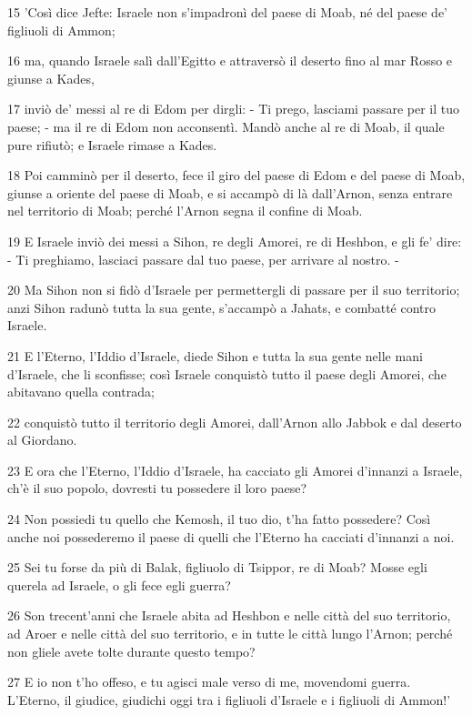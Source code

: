 \par 15 'Così dice Jefte: Israele non s'impadronì del paese di Moab, né del paese de' figliuoli di Ammon;
\par 16 ma, quando Israele salì dall'Egitto e attraversò il deserto fino al mar Rosso e giunse a Kades,
\par 17 inviò de' messi al re di Edom per dirgli: - Ti prego, lasciami passare per il tuo paese; - ma il re di Edom non acconsentì. Mandò anche al re di Moab, il quale pure rifiutò; e Israele rimase a Kades.
\par 18 Poi camminò per il deserto, fece il giro del paese di Edom e del paese di Moab, giunse a oriente del paese di Moab, e si accampò di là dall'Arnon, senza entrare nel territorio di Moab; perché l'Arnon segna il confine di Moab.
\par 19 E Israele inviò dei messi a Sihon, re degli Amorei, re di Heshbon, e gli fe' dire: - Ti preghiamo, lasciaci passare dal tuo paese, per arrivare al nostro. -
\par 20 Ma Sihon non si fidò d'Israele per permettergli di passare per il suo territorio; anzi Sihon radunò tutta la sua gente, s'accampò a Jahats, e combatté contro Israele.
\par 21 E l'Eterno, l'Iddio d'Israele, diede Sihon e tutta la sua gente nelle mani d'Israele, che li sconfisse; così Israele conquistò tutto il paese degli Amorei, che abitavano quella contrada;
\par 22 conquistò tutto il territorio degli Amorei, dall'Arnon allo Jabbok e dal deserto al Giordano.
\par 23 E ora che l'Eterno, l'Iddio d'Israele, ha cacciato gli Amorei d'innanzi a Israele, ch'è il suo popolo, dovresti tu possedere il loro paese?
\par 24 Non possiedi tu quello che Kemosh, il tuo dio, t'ha fatto possedere? Così anche noi possederemo il paese di quelli che l'Eterno ha cacciati d'innanzi a noi.
\par 25 Sei tu forse da più di Balak, figliuolo di Tsippor, re di Moab? Mosse egli querela ad Israele, o gli fece egli guerra?
\par 26 Son trecent'anni che Israele abita ad Heshbon e nelle città del suo territorio, ad Aroer e nelle città del suo territorio, e in tutte le città lungo l'Arnon; perché non gliele avete tolte durante questo tempo?
\par 27 E io non t'ho offeso, e tu agisci male verso di me, movendomi guerra. L'Eterno, il giudice, giudichi oggi tra i figliuoli d'Israele e i figliuoli di Ammon!'
